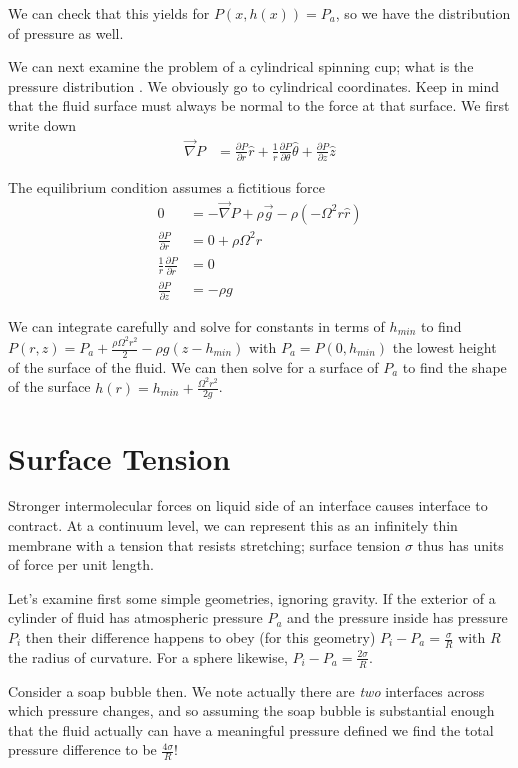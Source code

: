 \documentclass[10pt]{report}
\newcommand{\pd}[2]{\frac{\partial #1}{\partial#2}}
\begin{document}
We can check that this yields for $P(x,h(x)) = P_a$, so we have the distribution of pressure as well.

We can next examine the problem of a cylindrical spinning cup; what is the pressure distribution . We obviously go to cylindrical coordinates. Keep in mind that the fluid surface must always be normal to the force at that surface. We first write down
\begin{align}
    \vec{\nabla} P &= \pd{P}{r}\hat{r} + \frac{1}{r}\pd{P}{\theta}\hat{\theta} + \pd{P}{z}\hat{z}
\end{align}

The equilibrium condition assumes a fictitious force
\begin{align}
    0 &= -\vec{\nabla}P + \rho\vec{g} - \rho\left( -\Omega^2 r\hat{r} \right)\\
    \pd{P}{r} &= 0 + \rho \Omega^2 r\\
    \frac{1}{r}\pd{P}{r} &= 0\\
    \pd{P}{z} &= -\rho g
\end{align}

We can integrate carefully and solve for constants in terms of $h_{min}$ to find $P(r,z) = P_a + \frac{\rho \Omega^2 r^2}{2} - \rho g (z - h_{min})$ with $P_a = P(0,h_{min})$ the lowest height of the surface of the fluid. We can then solve for a surface of $P_a$ to find the shape of the surface $h(r) = h_{min} + \frac{\Omega^2 r^2}{2g}$. 

\section{Surface Tension}

Stronger intermolecular forces on liquid side of an interface causes interface to contract. At a continuum level, we can represent this as an infinitely thin membrane with a tension that resists stretching; surface tension $\sigma$ thus has units of force per unit length. 

Let's examine first some simple geometries, ignoring gravity. If the exterior of a cylinder of fluid has atmospheric pressure $P_a$ and the pressure inside has pressure $P_i$ then their difference happens to obey (for this geometry) $P_i - P_a = \frac{\sigma}{R}$ with $R$ the radius of curvature. For a sphere likewise, $P_i - P_a = \frac{2\sigma}{R}$. 

Consider a soap bubble then. We note actually there are \emph{two} interfaces across which pressure changes, and so assuming the soap bubble is substantial enough that the fluid actually can have a meaningful pressure defined we find the total pressure difference to be $\frac{4\sigma}{R}$!
\end{document}
